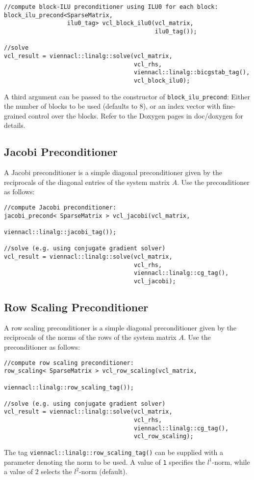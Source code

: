 \begin{lstlisting}
//compute block-ILU preconditioner using ILU0 for each block:
block_ilu_precond<SparseMatrix,
                  ilu0_tag> vcl_block_ilu0(vcl_matrix,
                                           ilu0_tag());

//solve
vcl_result = viennacl::linalg::solve(vcl_matrix,
                                     vcl_rhs,
                                     viennacl::linalg::bicgstab_tag(),
                                     vcl_block_ilu0);
\end{lstlisting}
A third argument can be passed to the constructor of \lstinline|block_ilu_precond|: 
Either the number of blocks to be used (defaults to $8$), or an index vector with fine-grained control over the blocks. Refer to the Doxygen pages in doc/doxygen for details.


\subsection{Jacobi Preconditioner}
A Jacobi preconditioner is a simple diagonal preconditioner given by the reciprocals of the diagonal entries of the system matrix $A$.
Use the preconditioner as follows:
\begin{lstlisting}
//compute Jacobi preconditioner:
jacobi_precond< SparseMatrix > vcl_jacobi(vcl_matrix,
                                          viennacl::linalg::jacobi_tag());

//solve (e.g. using conjugate gradient solver)
vcl_result = viennacl::linalg::solve(vcl_matrix,
                                     vcl_rhs,
                                     viennacl::linalg::cg_tag(),
                                     vcl_jacobi);
\end{lstlisting}


\subsection{Row Scaling Preconditioner}
A row scaling preconditioner is a simple diagonal preconditioner given by the reciprocals of the norms of the rows of the system matrix $A$.
Use the preconditioner as follows:
\begin{lstlisting}
//compute row scaling preconditioner:
row_scaling< SparseMatrix > vcl_row_scaling(vcl_matrix,
                                      viennacl::linalg::row_scaling_tag());

//solve (e.g. using conjugate gradient solver)
vcl_result = viennacl::linalg::solve(vcl_matrix,
                                     vcl_rhs,
                                     viennacl::linalg::cg_tag(),
                                     vcl_row_scaling);
\end{lstlisting}
The tag \lstinline|viennacl::linalg::row_scaling_tag()| can be supplied with a parameter denoting the norm to be used. A value of \lstinline|1| specifies the
$l^1$-norm, while a value of $2$ selects the $l^2$-norm (default).



